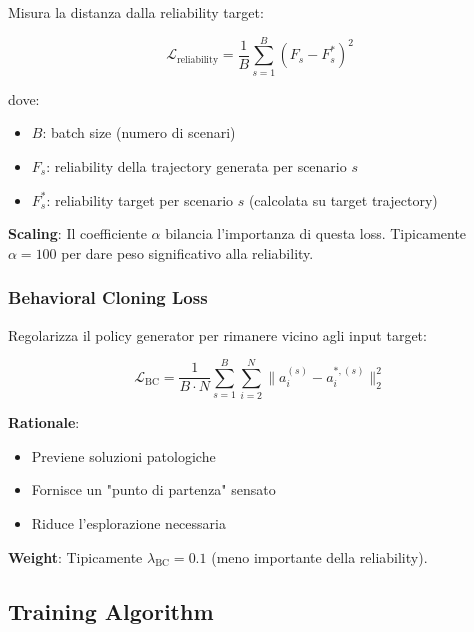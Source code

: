 \documentclass[11pt,a4paper]{article}
\begin{document}
Misura la distanza dalla reliability target:

\begin{equation}
\mathcal{L}_{\text{reliability}} = \frac{1}{B} \sum_{s=1}^B (F_s - F_s^*)^2
\end{equation}

dove:
\begin{itemize}
    \item $B$: batch size (numero di scenari)
    \item $F_s$: reliability della trajectory generata per scenario $s$
    \item $F_s^*$: reliability target per scenario $s$ (calcolata su target trajectory)
\end{itemize}

\textbf{Scaling}: Il coefficiente $\alpha$ bilancia l'importanza di questa loss. Tipicamente $\alpha = 100$ per dare peso significativo alla reliability.

\subsubsection{Behavioral Cloning Loss}

Regolarizza il policy generator per rimanere vicino agli input target:

\begin{equation}
\mathcal{L}_{\text{BC}} = \frac{1}{B \cdot N} \sum_{s=1}^B \sum_{i=2}^N \|a_i^{(s)} - a_i^{*,(s)}\|_2^2
\end{equation}

\textbf{Rationale}:
\begin{itemize}
    \item Previene soluzioni patologiche
    \item Fornisce un "punto di partenza" sensato
    \item Riduce l'esplorazione necessaria
\end{itemize}

\textbf{Weight}: Tipicamente $\lambda_{\text{BC}} = 0.1$ (meno importante della reliability).

\subsection{Training Algorithm}
\end{document}
